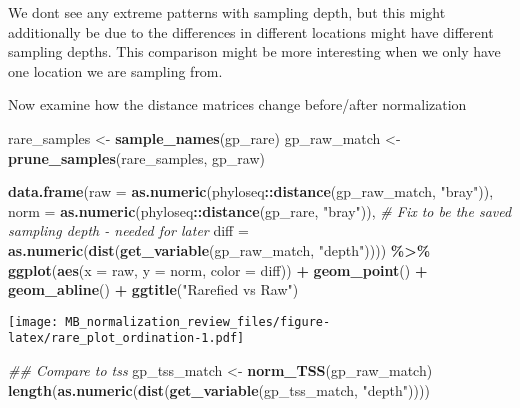 \documentclass[
]{book}
\newenvironment{Shaded}{\begin{snugshade}}{\end{snugshade}}
\newcommand{\CommentTok}[1]{\textcolor[rgb]{0.56,0.35,0.01}{\textit{#1}}}
\newcommand{\DataTypeTok}[1]{\textcolor[rgb]{0.13,0.29,0.53}{#1}}
\newcommand{\KeywordTok}[1]{\textcolor[rgb]{0.13,0.29,0.53}{\textbf{#1}}}
\newcommand{\NormalTok}[1]{#1}
\newcommand{\OperatorTok}[1]{\textcolor[rgb]{0.81,0.36,0.00}{\textbf{#1}}}
\newcommand{\StringTok}[1]{\textcolor[rgb]{0.31,0.60,0.02}{#1}}
\begin{document}
We dont see any extreme patterns with sampling depth, but this might additionally be due to the differences in different locations might have different sampling depths. This comparison might be more interesting when we only have one location we are sampling from.

Now examine how the distance matrices change before/after normalization

\begin{Shaded}
\begin{Highlighting}[]
\NormalTok{rare\_samples \textless{}{-}}\StringTok{ }\KeywordTok{sample\_names}\NormalTok{(gp\_rare)}
\NormalTok{gp\_raw\_match \textless{}{-}}\StringTok{ }\KeywordTok{prune\_samples}\NormalTok{(rare\_samples, gp\_raw)}

\KeywordTok{data.frame}\NormalTok{(}\DataTypeTok{raw =} \KeywordTok{as.numeric}\NormalTok{(phyloseq}\OperatorTok{::}\KeywordTok{distance}\NormalTok{(gp\_raw\_match, }\StringTok{"bray"}\NormalTok{)), }
           \DataTypeTok{norm =} \KeywordTok{as.numeric}\NormalTok{(phyloseq}\OperatorTok{::}\KeywordTok{distance}\NormalTok{(gp\_rare, }\StringTok{"bray"}\NormalTok{)), }
           \CommentTok{\# Fix to be the saved sampling depth {-} needed for later}
           \DataTypeTok{diff =} \KeywordTok{as.numeric}\NormalTok{(}\KeywordTok{dist}\NormalTok{(}\KeywordTok{get\_variable}\NormalTok{(gp\_raw\_match, }\StringTok{"depth"}\NormalTok{)))) }\OperatorTok{\%\textgreater{}\%}\StringTok{ }
\StringTok{    }\KeywordTok{ggplot}\NormalTok{(}\KeywordTok{aes}\NormalTok{(}\DataTypeTok{x =}\NormalTok{ raw, }\DataTypeTok{y =}\NormalTok{ norm, }\DataTypeTok{color =}\NormalTok{ diff)) }\OperatorTok{+}\StringTok{ }
\StringTok{        }\KeywordTok{geom\_point}\NormalTok{() }\OperatorTok{+}\StringTok{ }
\StringTok{        }\KeywordTok{geom\_abline}\NormalTok{() }\OperatorTok{+}
\StringTok{    }\KeywordTok{ggtitle}\NormalTok{(}\StringTok{"Rarefied vs Raw"}\NormalTok{)}
\end{Highlighting}
\end{Shaded}

\texttt{[image: MB\_normalization\_review\_files/figure-latex/rare\_plot\_ordination-1.pdf]}

\begin{Shaded}
\begin{Highlighting}[]
\CommentTok{\#\# Compare to tss}
\NormalTok{gp\_tss\_match \textless{}{-}}\StringTok{ }\KeywordTok{norm\_TSS}\NormalTok{(gp\_raw\_match)}
\KeywordTok{length}\NormalTok{(}\KeywordTok{as.numeric}\NormalTok{(}\KeywordTok{dist}\NormalTok{(}\KeywordTok{get\_variable}\NormalTok{(gp\_tss\_match, }\StringTok{"depth"}\NormalTok{))))}
\end{Highlighting}
\end{Shaded}
\end{document}
